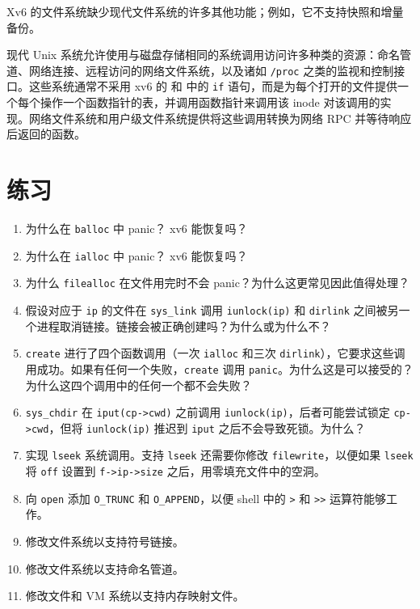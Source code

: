 Xv6 的文件系统缺少现代文件系统的许多其他功能；例如，它不支持快照和增量备份。

现代 Unix 系统允许使用与磁盘存储相同的系统调用访问许多种类的资源：命名管道、网络连接、远程访问的网络文件系统，以及诸如 \lstinline{/proc} 之类的监视和控制接口。这些系统通常不采用 xv6 的  和  中的 \lstinline{if} 语句，而是为每个打开的文件提供一个每个操作一个函数指针的表，并调用函数指针来调用该 inode 对该调用的实现。网络文件系统和用户级文件系统提供将这些调用转换为网络 RPC 并等待响应后返回的函数。
\section{练习}

\begin{enumerate}

\item 为什么在 \lstinline{balloc} 中 panic？ xv6 能恢复吗？

\item 为什么在 \lstinline{ialloc} 中 panic？ xv6 能恢复吗？

\item 为什么 \lstinline{filealloc} 在文件用完时不会 panic？为什么这更常见因此值得处理？

\item 假设对应于 \lstinline{ip} 的文件在 \lstinline{sys_link} 调用 \lstinline{iunlock(ip)} 和 \lstinline{dirlink} 之间被另一个进程取消链接。链接会被正确创建吗？为什么或为什么不？

\item \lstinline{create} 进行了四个函数调用（一次 \lstinline{ialloc} 和三次 \lstinline{dirlink}），它要求这些调用成功。如果有任何一个失败，\lstinline{create} 调用 \lstinline{panic}。为什么这是可以接受的？为什么这四个调用中的任何一个都不会失败？

\item \lstinline{sys_chdir} 在 \lstinline{iput(cp->cwd)} 之前调用 \lstinline{iunlock(ip)}，后者可能尝试锁定 \lstinline{cp->cwd}，但将 \lstinline{iunlock(ip)} 推迟到 \lstinline{iput} 之后不会导致死锁。为什么？

\item 实现 \lstinline{lseek} 系统调用。支持 \lstinline{lseek} 还需要你修改 \lstinline{filewrite}，以便如果 \lstinline{lseek} 将 \lstinline{off} 设置到 \lstinline{f->ip->size} 之后，用零填充文件中的空洞。

\item 向 \lstinline{open} 添加 \lstinline{O_TRUNC} 和 \lstinline{O_APPEND}，以便 shell 中的 \lstinline{>} 和 \lstinline{>>} 运算符能够工作。

\item 修改文件系统以支持符号链接。

\item 修改文件系统以支持命名管道。

\item 修改文件和 VM 系统以支持内存映射文件。

\end{enumerate}
